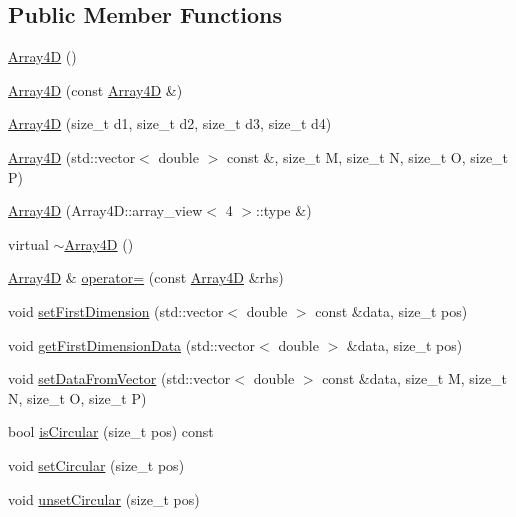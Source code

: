 \subsection*{Public Member Functions}
\begin{DoxyCompactItemize}
\item 
\mbox{\hyperlink{class_array4_d_a1bc84c0dcc22ed0e218040b01f56b816}{Array4D}} ()
\item 
\mbox{\hyperlink{class_array4_d_a7395b077e949df98c4cfe0c0aa93f2a8}{Array4D}} (const \mbox{\hyperlink{class_array4_d}{Array4D}} \&)
\item 
\mbox{\hyperlink{class_array4_d_a2b0e0536b5e40fec5694fdcaebdcff6a}{Array4D}} (size\+\_\+t d1, size\+\_\+t d2, size\+\_\+t d3, size\+\_\+t d4)
\item 
\mbox{\hyperlink{class_array4_d_a8ee78d0fd3a893d067386b1afd9a742e}{Array4D}} (std\+::vector$<$ double $>$ const \&, size\+\_\+t M, size\+\_\+t N, size\+\_\+t O, size\+\_\+t P)
\item 
\mbox{\hyperlink{class_array4_d_a5c5b3aa5f576edefc2e9a61afa87e451}{Array4D}} (Array4\+D\+::array\+\_\+view$<$ 4 $>$\+::type \&)
\item 
virtual \mbox{\hyperlink{class_array4_d_ae82ddfe43f803f16e7904dc839b63eab}{$\sim$\+Array4D}} ()
\item 
\mbox{\hyperlink{class_array4_d}{Array4D}} \& \mbox{\hyperlink{class_array4_d_aa56a432098cf289a2cc340dfc5635634}{operator=}} (const \mbox{\hyperlink{class_array4_d}{Array4D}} \&rhs)
\item 
void \mbox{\hyperlink{class_array4_d_a27a7b3dc2759941c5849a3843d9ad5d1}{set\+First\+Dimension}} (std\+::vector$<$ double $>$ const \&data, size\+\_\+t pos)
\item 
void \mbox{\hyperlink{class_array4_d_ac4d55dadfae71139e8d860fe171146c7}{get\+First\+Dimension\+Data}} (std\+::vector$<$ double $>$ \&data, size\+\_\+t pos)
\item 
void \mbox{\hyperlink{class_array4_d_af6879e11496cc7a736b813bbdeccd5d5}{set\+Data\+From\+Vector}} (std\+::vector$<$ double $>$ const \&data, size\+\_\+t M, size\+\_\+t N, size\+\_\+t O, size\+\_\+t P)
\item 
bool \mbox{\hyperlink{class_array4_d_abbcf6caa1305cd5709e6f194e961614d}{is\+Circular}} (size\+\_\+t pos) const
\item 
void \mbox{\hyperlink{class_array4_d_ab4574e45a22610a3e9768542afe76797}{set\+Circular}} (size\+\_\+t pos)
\item 
void \mbox{\hyperlink{class_array4_d_ac6d1282e0d765748c192a72d60274853}{unset\+Circular}} (size\+\_\+t pos)

\end{DoxyCompactItemize}
